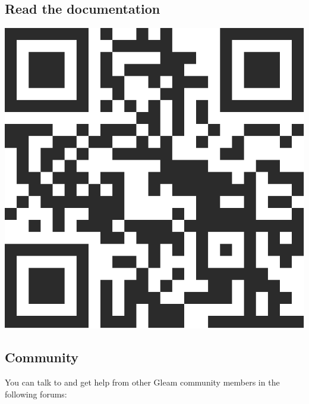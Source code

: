 \vs
\subsection*{\rmfamily Read the documentation}
\medskip
{
  \begin{center}    
    \includegraphics[height=0.15\paperheight]{img/gleam-qr-charcoal.pdf}
  \end{center}

}

\vs
\subsection*{\rmfamily Community}

You can talk to and get help from other Gleam community members in the following forums:

